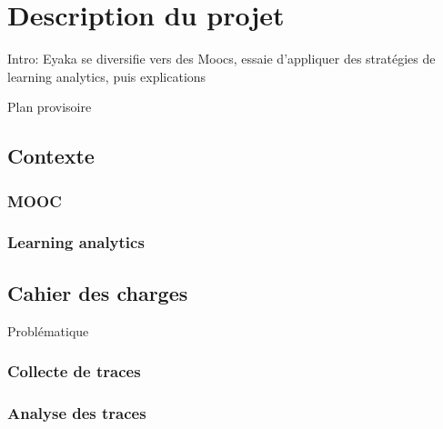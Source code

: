 \chapter{Description du projet}

    Intro: Eyaka se diversifie vers des Moocs, essaie d'appliquer des stratégies de learning analytics, puis explications


    Plan provisoire

    \section{Contexte  }
        \subsection{MOOC  }
        \subsection{Learning analytics }


    \section{Cahier des charges  }

        Problématique

        \subsection{Collecte de traces}


        \subsection{Analyse des traces}